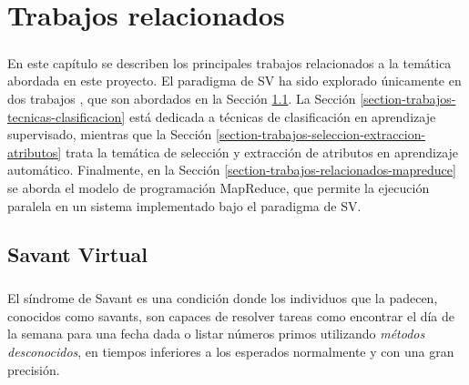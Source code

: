 \chapter{Trabajos relacionados} \label{section-trabajo-relacionado}

\paragraph{}En este capítulo se describen los principales trabajos relacionados a la temática abordada en este proyecto.
El paradigma de SV ha sido explorado únicamente en dos trabajos \cite{savant-original} \cite{savant-bag}, que son abordados en la Sección \ref{section-trabajos-relacionados-savant}.
La Sección \ref{section-trabajos-tecnicas-clasificacion} está dedicada a técnicas de clasificación en aprendizaje supervisado, mientras que la Sección \ref{section-trabajos-seleccion-extraccion-atributos} trata la temática de selección y extracción de atributos en aprendizaje automático.
Finalmente, en la Sección \ref{section-trabajos-relacionados-mapreduce} se aborda el modelo de programación MapReduce, que permite la ejecución paralela en un sistema implementado bajo el paradigma de SV.


\section{Savant Virtual} \label{section-trabajos-relacionados-savant}

\paragraph{} El síndrome de Savant es una condición donde los individuos que la padecen, conocidos como savants, son capaces de resolver tareas como encontrar el día de la semana para una fecha dada o listar números primos utilizando \textit{métodos desconocidos}, en tiempos inferiores a los esperados normalmente y con una gran precisión. 


